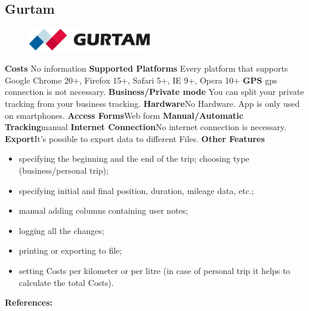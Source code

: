 \begin{singlespace}
\section{Gurtam}
\begin{figure}
  \begin{center}
    \includegraphics[width=0.48\textwidth]{bilder/gurtam}
  \end{center}
\end{figure}
\textbf{Costs} No information 
\newline\newline
\textbf{Supported Platforms} Every platform that supports  Google Chrome 20+, Firefox 15+, Safari 5+, IE 9+, Opera 10+
\newline\newline
\textbf{GPS} \gls{gps} connection is not necessary.
\newline\newline
\textbf{Business/Private mode} You can split your private tracking from your business tracking.
\newline\newline
\textbf{Hardware}No Hardware. App is only used on smartphones.
\newline\newline
\textbf{Access Forms}Web form
\newline\newline
\textbf{Manual/Automatic Tracking}manual
\newline\newline
\textbf{Internet Connection}No internet connection is necessary.
\newline\newline
\textbf{Export}It’s possible to export data to different Files.
\newline\newline
\textbf{Other Features}
\begin{itemize}
\item specifying the beginning and the end of the trip;
choosing type (business/personal trip);
\item specifying initial and final position, duration, mileage data, etc.;
\item manual adding columns containing user notes;
\item logging all the changes;
\item printing or exporting to file;
\item setting Costs per kilometer or per litre (in case of personal trip it helps to calculate the total Costs).
\end{itemize}
\textbf{References:} \cite{Gurtam_Wialon_Driving_Logbook}
\newpage


\end{singlespace}

